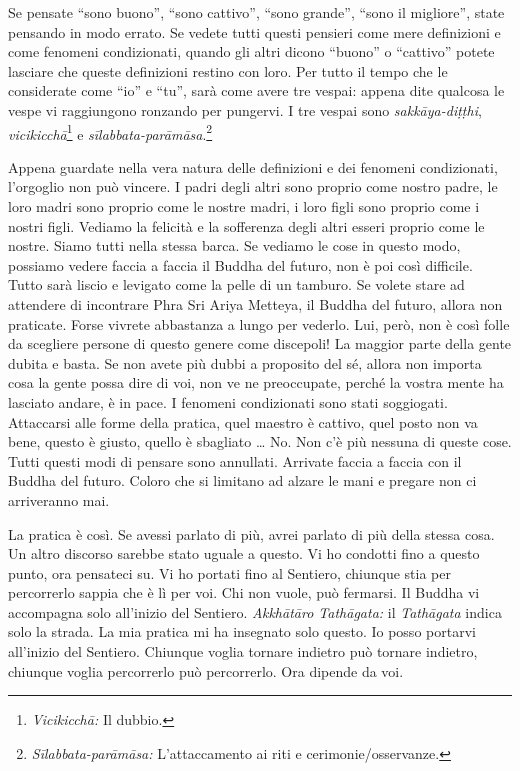 Se pensate ``sono buono'', ``sono cattivo'', ``sono grande'', ``sono il
migliore'', state pensando in modo errato. Se vedete tutti questi
pensieri come mere definizioni e come fenomeni condizionati, quando gli
altri dicono ``buono'' o ``cattivo'' potete lasciare che queste
definizioni restino con loro. Per tutto il tempo che le considerate come
``io'' e ``tu'', sarà come avere tre vespai: appena dite qualcosa le
vespe vi raggiungono ronzando per pungervi. I tre vespai sono
\emph{sakkāya-diṭṭhi}, \emph{vicikicchā}\footnote{\emph{Vicikicchā:} Il
  dubbio.} e \emph{sīlabbata-parāmāsa}.\footnote{\emph{Sīlabbata-parāmāsa:}
  L'attaccamento ai riti e cerimonie/osservanze.}

Appena guardate nella vera natura delle definizioni e dei fenomeni
condizionati, l'orgoglio non può vincere. I padri degli altri sono
proprio come nostro padre, le loro madri sono proprio come le nostre
madri, i loro figli sono proprio come i nostri figli. Vediamo la
felicità e la sofferenza degli altri esseri proprio come le nostre.
Siamo tutti nella stessa barca. Se vediamo le cose in questo modo,
possiamo vedere faccia a faccia il Buddha del futuro, non è poi così
difficile. Tutto sarà liscio e levigato come la pelle di un tamburo. Se
volete stare ad attendere di incontrare Phra Sri Ariya Metteya, il
Buddha del futuro, allora non praticate. Forse vivrete abbastanza a
lungo per vederlo. Lui, però, non è così folle da scegliere persone di
questo genere come discepoli! La maggior parte della gente dubita e
basta. Se non avete più dubbi a proposito del sé, allora non importa
cosa la gente possa dire di voi, non ve ne preoccupate, perché la vostra
mente ha lasciato andare, è in pace. I fenomeni condizionati sono stati
soggiogati. Attaccarsi alle forme della pratica, quel maestro è cattivo,
quel posto non va bene, questo è giusto, quello è sbagliato \ldots{} No. Non
c'è più nessuna di queste cose. Tutti questi modi di pensare sono
annullati. Arrivate faccia a faccia con il Buddha del futuro. Coloro che
si limitano ad alzare le mani e pregare non ci arriveranno mai.

La pratica è così. Se avessi parlato di più, avrei parlato di più della
stessa cosa. Un altro discorso sarebbe stato uguale a questo. Vi ho
condotti fino a questo punto, ora pensateci su. Vi ho portati fino al
Sentiero, chiunque stia per percorrerlo sappia che è lì per voi. Chi non
vuole, può fermarsi. Il Buddha vi accompagna solo all'inizio del
Sentiero. \emph{Akkhātāro Tathāgata:} il \emph{Tathāgata} indica solo la
strada. La mia pratica mi ha insegnato solo questo. Io posso portarvi
all'inizio del Sentiero. Chiunque voglia tornare indietro può tornare
indietro, chiunque voglia percorrerlo può percorrerlo. Ora dipende da
voi.

